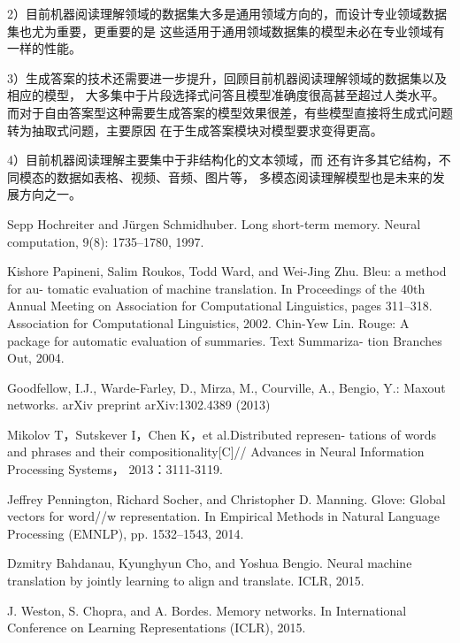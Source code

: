 \documentclass{article}
\begin{document}
\begin{multicols}{2}
2）目前机器阅读理解领域的数据集大多是通用领域方向的，而设计专业领域数据集也尤为重要，更重要的是
这些适用于通用领域数据集的模型未必在专业领域有一样的性能。

3）生成答案的技术还需要进一步提升，回顾目前机器阅读理解领域的数据集以及相应的模型，
大多集中于片段选择式问答且模型准确度很高甚至超过人类水平。
而对于自由答案型这种需要生成答案的模型效果很差，有些模型直接将生成式问题转为抽取式问题，主要原因
在于生成答案模块对模型要求变得更高。

4）目前机器阅读理解主要集中于非结构化的文本领域，而
还有许多其它结构，不同模态的数据如表格、视频、音频、图片等，
多模态阅读理解模型也是未来的发展方向之一。






\begin{thebibliography}{99}
    Sepp Hochreiter and Jürgen Schmidhuber. Long short-term memory. Neural computation, 9(8):
    1735–1780, 1997.

    Kishore Papineni, Salim Roukos, Todd Ward, and Wei-Jing Zhu. Bleu: a method for au-
    tomatic evaluation of machine translation. In Proceedings of the 40th Annual Meeting on
    Association for Computational Linguistics, pages 311–318. Association for Computational
    Linguistics, 2002.
    Chin-Yew Lin. Rouge: A package for automatic evaluation of summaries. Text Summariza-
    tion Branches Out, 2004.

    Goodfellow, I.J., Warde-Farley, D., Mirza, M., Courville, A., Bengio, Y.: Maxout networks.
    arXiv preprint arXiv:1302.4389 (2013)

    Mikolov T，Sutskever I，Chen K，et al.Distributed represen-
    tations of words and phrases and their compositionality[C]//
    Advances in Neural Information Processing Systems，
    2013：3111-3119.

    Jeffrey Pennington, Richard Socher, and Christopher D. Manning. Glove: Global vectors for
    word//w representation. In Empirical Methods in Natural Language Processing (EMNLP), pp.
    1532–1543, 2014.

    Dzmitry Bahdanau, Kyunghyun Cho, and Yoshua Bengio. Neural machine translation by jointly
    learning to align and translate. ICLR, 2015.

    J. Weston, S. Chopra, and A. Bordes. Memory networks. In International Conference on
    Learning Representations (ICLR), 2015.


\end{thebibliography}
\end{multicols}
\end{document}

